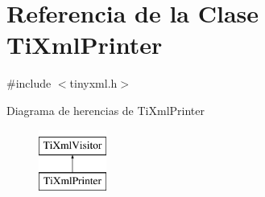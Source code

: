 \hypertarget{classTiXmlPrinter}{\section{\-Referencia de la \-Clase \-Ti\-Xml\-Printer}
\label{classTiXmlPrinter}
}


{\ttfamily \#include $<$tinyxml.\-h$>$}

\-Diagrama de herencias de \-Ti\-Xml\-Printer\begin{figure}[H]
\begin{center}
\leavevmode
\includegraphics[height=2.000000cm]{classTiXmlPrinter}
\end{center}
\end{figure}
